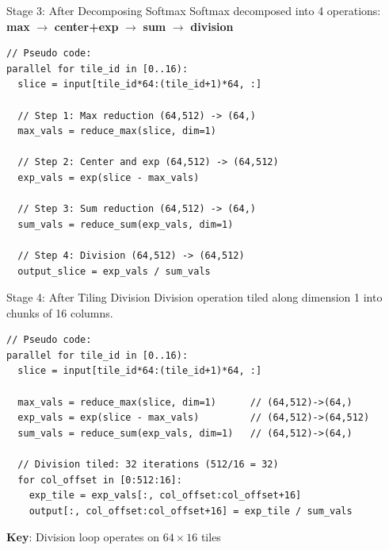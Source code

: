 \documentclass[aspectratio=169]{beamer}
\begin{document}
\begin{frame}[fragile]{Stage 3: After Decomposing Softmax}
Softmax decomposed into 4 operations:
\textbf{max} $\rightarrow$ \textbf{center+exp} $\rightarrow$ \textbf{sum} $\rightarrow$ \textbf{division}

\begin{lstlisting}
// Pseudo code:
parallel for tile_id in [0..16):
  slice = input[tile_id*64:(tile_id+1)*64, :]

  // Step 1: Max reduction (64,512) -> (64,)
  max_vals = reduce_max(slice, dim=1)

  // Step 2: Center and exp (64,512) -> (64,512)
  exp_vals = exp(slice - max_vals)

  // Step 3: Sum reduction (64,512) -> (64,)
  sum_vals = reduce_sum(exp_vals, dim=1)

  // Step 4: Division (64,512) -> (64,512)
  output_slice = exp_vals / sum_vals
\end{lstlisting}
\end{frame}

\begin{frame}[fragile]{Stage 4: After Tiling Division}
Division operation tiled along dimension 1 into chunks of 16 columns.

\begin{lstlisting}
// Pseudo code:
parallel for tile_id in [0..16):
  slice = input[tile_id*64:(tile_id+1)*64, :]

  max_vals = reduce_max(slice, dim=1)      // (64,512)->(64,)
  exp_vals = exp(slice - max_vals)         // (64,512)->(64,512)
  sum_vals = reduce_sum(exp_vals, dim=1)   // (64,512)->(64,)

  // Division tiled: 32 iterations (512/16 = 32)
  for col_offset in [0:512:16]:
    exp_tile = exp_vals[:, col_offset:col_offset+16]
    output[:, col_offset:col_offset+16] = exp_tile / sum_vals
\end{lstlisting}

\vspace{0.2cm}
\textbf{Key}: Division loop operates on $64 \times 16$ tiles
\end{frame}
\end{document}
